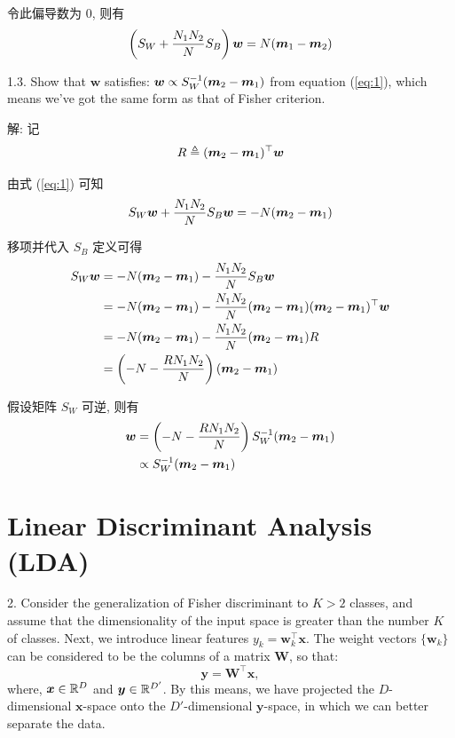 \documentclass{article}
\begin{document}
令此偏导数为 0, 则有
\begin{equation}
  \left(S_W+\frac{N_1N_2}{N}S_B\right)\bm{w}=N(\bm{m}_1-\bm{m}_2)
\end{equation}

1.3. Show that $\bm{w}$ satisfies: $\bm{w}\propto S_{W}^{-1}(\bm{m}_2-\bm{m}_1)$ from equation (\ref{eq:1}), which means we've got the same form as that of Fisher criterion.

解: 记
\begin{equation}
  R\triangleq(\bm{m}_2-\bm{m}_1)^{\top}\bm{w}
\end{equation}

由式 (\ref{eq:1}) 可知
\begin{equation}
  S_W\bm{w}+\frac{N_1N_2}{N}S_B\bm{w}=-N(\bm{m}_2-\bm{m}_1)
\end{equation}

移项并代入 $S_B$ 定义可得
\begin{equation}
  \begin{aligned}
    S_W\bm{w}
    &=-N(\bm{m}_2-\bm{m}_1)-\frac{N_1N_2}{N}S_B\bm{w}\\
    &=-N(\bm{m}_2-\bm{m}_1)-\frac{N_1N_2}{N}(\bm{m}_2-\bm{m}_1)(\bm{m}_2-\bm{m}_1)^{\top}\bm{w}\\
    &=-N(\bm{m}_2-\bm{m}_1)-\frac{N_1N_2}{N}(\bm{m}_2-\bm{m}_1)R\\
    &=\left(-N-\frac{RN_1N_2}{N}\right)(\bm{m}_2-\bm{m}_1)\\
  \end{aligned}
\end{equation}

假设矩阵 $S_W$ 可逆, 则有
\begin{equation}
  \begin{aligned}
    \bm{w}
    &=\left(-N-\frac{RN_1N_2}{N}\right)S_W^{-1}(\bm{m}_2-\bm{m}_1)\\
    &\propto S_{W}^{-1}(\bm{m}_2-\bm{m}_1)\\
  \end{aligned}
\end{equation}

\section*{Linear Discriminant Analysis (LDA)}

2. Consider the generalization of Fisher discriminant to $K>2$ classes, and assume that the dimensionality of the input space is greater than the number $K$ of classes. Next, we introduce linear features $y_{k}=\bm{w}_{k}^{\top}\bm{x}$. The weight vectors $\{\bm{w}_{k}\}$ can be considered to be the columns of a matrix $\bm{W}$, so that:
\begin{equation}
  \bm{y}=\bm{W}^{\top}\bm{x},
\end{equation}
where, $\bm{x}\in\mathbb{R}^{D}$ and $\bm{y}\in \mathbb{R}^{D'}$. By this means, we have projected the $D$-dimensional $\bm{x}$-space onto the $D'$-dimensional $\bm{y}$-space, in which we can better separate the data.
\end{document}
